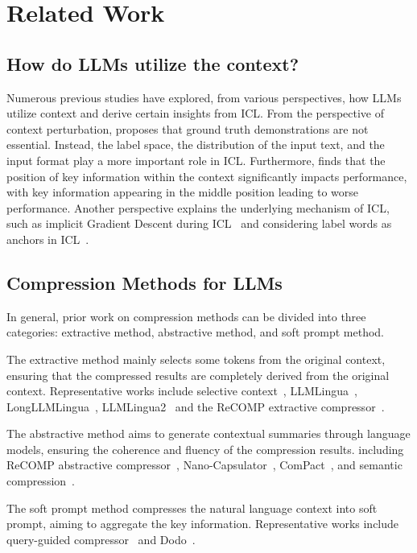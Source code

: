 \section{Related Work}
\subsection{How do LLMs utilize the context?}
Numerous previous studies have explored, from various perspectives, how LLMs utilize context and derive certain insights from ICL. From the perspective of context perturbation, \citet{min2022rethinkingroledemonstrationsmakes} proposes that ground truth demonstrations are not essential. Instead, the label space, the distribution of the input text, and the input format play a more important role in ICL. Furthermore, \citet{liu2023lostmiddlelanguagemodels} finds that the position of key information within the context significantly impacts performance, with key information appearing in the middle position leading to worse performance. Another perspective explains the underlying mechanism of ICL, such as implicit Gradient Descent during ICL~\cite{dai2023gptlearnincontextlanguage,vonoswald2023transformerslearnincontextgradient} and considering label words as anchors in ICL~\cite{wang2023labelwordsanchorsinformation}.
\subsection{Compression Methods for LLMs}
In general, prior work on compression methods can be divided into three categories: extractive method, abstractive method, and soft prompt %
method. 

The extractive method mainly selects some tokens 
from the original context, ensuring that the compressed results are completely derived from the original context. 
Representative works include selective context~\cite{li2023compressingcontextenhanceinference}, LLMLingua~\cite{jiang2023llmlinguacompressingpromptsaccelerated}, LongLLMLingua~\cite{jiang2024longllmlinguaacceleratingenhancingllms}, LLMLingua2~\cite{pan2024llmlingua2datadistillationefficient} and the ReCOMP extractive compressor~\cite{xu2023recompimprovingretrievalaugmentedlms}. 

The abstractive method aims to generate contextual summaries through language models, ensuring the coherence and fluency of the compression results. 
including ReCOMP abstractive compressor~\cite{xu2023recompimprovingretrievalaugmentedlms}, Nano-Capsulator~\cite{chuang2024learningcompresspromptnatural}, ComPact~\cite{yoon2024compactcompressingretrieveddocuments}, and semantic compression~\cite{fei2023extendingcontextwindowlarge}.

The soft prompt 
method compresses the natural language context into soft prompt, %
aiming to aggregate the key information. Representative works include query-guided compressor~\cite{cao2024retainingkeyinformationhigh} and Dodo~\cite{Qin_2024}.